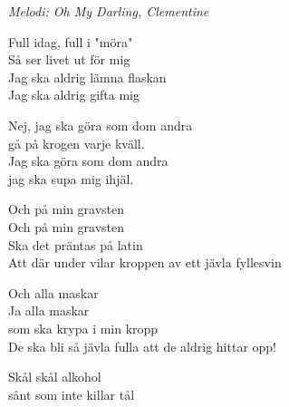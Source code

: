 {\footnotesize\textit{Melodi: Oh My Darling, Clementine}}\par
\vspace{10pt}
Full idag, full i "möra"\\
Så ser livet ut för mig\\
Jag ska aldrig lämna flaskan \\
Jag ska aldrig gifta mig\par
\vspace{10pt}
Nej, jag ska göra som dom andra\\
gå på krogen varje kväll.\\
Jag ska göra som dom andra\\
jag ska supa mig ihjäl.\par
\vspace{10pt}
Och på min gravsten\\
Och på min gravsten\\
Ska det präntas på latin\\
Att där under vilar kroppen av ett jävla fyllesvin\par
\vspace{10pt}
Och alla maskar\\
Ja alla maskar \\
som ska krypa i min kropp\\
De ska bli så jävla fulla att de aldrig hittar opp!\par
\vspace{10pt}
Skål skål alkohol\\
sånt som inte killar tål
